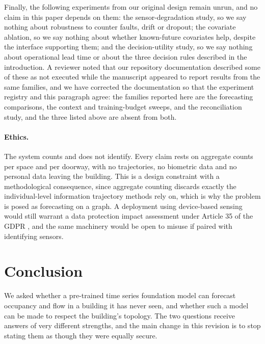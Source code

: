 \documentclass[11pt]{article}
\theoremstyle{plain}
\theoremstyle{definition}
\theoremstyle{remark}
\newif\ifrevisionmarkup
\newcommand{\new}[1]{\ifrevisionmarkup\textcolor{revision}{#1}\else#1\fi}
\begin{document}
\new{Finally, the following experiments from our original design remain unrun, and no claim in this paper depends on them: the sensor-degradation study, so we say nothing about robustness to counter faults, drift or dropout; the covariate ablation, so we say nothing about whether known-future covariates help, despite the interface supporting them; and the decision-utility study, so we say nothing about operational lead time or about the three decision rules described in the introduction. A reviewer noted that our repository documentation described some of these as not executed while the manuscript appeared to report results from the same families, and we have corrected the documentation so that the experiment registry and this paragraph agree: the families reported here are the forecasting comparisons, the context and training-budget sweeps, and the reconciliation study, and the three listed above are absent from both.}

\paragraph{Ethics.}
The system counts and does not identify. Every claim rests on aggregate counts per space and per doorway, with no trajectories, no biometric data and no personal data leaving the building. This is a design constraint with a methodological consequence, since aggregate counting discards exactly the individual-level information trajectory methods rely on, which is why the problem is posed as forecasting on a graph. A deployment using device-based sensing would still warrant a data protection impact assessment under Article 35 of the GDPR \citep{gdpr}, and the same machinery would be open to misuse if paired with identifying sensors.

\section{Conclusion}

We asked whether a pre-trained time series foundation model can forecast occupancy and flow in a building it has never seen, and whether such a model can be made to respect the building's topology. \new{The two questions receive answers of very different strengths, and the main change in this revision is to stop stating them as though they were equally secure.}
\end{document}
